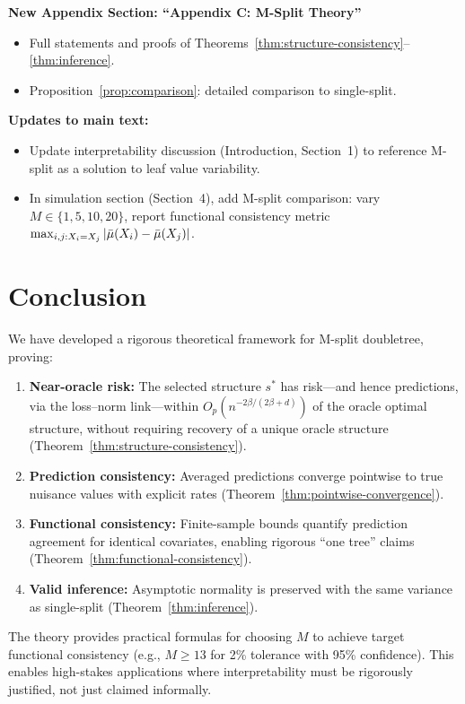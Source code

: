\documentclass[12pt]{article}
\begin{document}
\textbf{New Appendix Section: ``Appendix C: M-Split Theory''}
\begin{itemize}
\item Full statements and proofs of Theorems~\ref{thm:structure-consistency}--\ref{thm:inference}.
\item Proposition~\ref{prop:comparison}: detailed comparison to single-split.
\end{itemize}

\textbf{Updates to main text:}
\begin{itemize}
\item Update interpretability discussion (Introduction, Section~1) to reference M-split as a solution to leaf value variability.
\item In simulation section (Section~4), add M-split comparison: vary $M \in \{1, 5, 10, 20\}$, report functional consistency metric $\max_{i,j: X_i=X_j} |\bar{\mu}(X_i) - \bar{\mu}(X_j)|$.
\end{itemize}

\section{Conclusion}

We have developed a rigorous theoretical framework for M-split doubletree, proving:
\begin{enumerate}
\item \textbf{Near-oracle risk:} The selected structure $s^*$ has risk---and hence predictions, via the loss--norm link---within $O_p(n^{-2\beta/(2\beta+d)})$ of the oracle optimal structure, without requiring recovery of a unique oracle structure (Theorem~\ref{thm:structure-consistency}).
\item \textbf{Prediction consistency:} Averaged predictions converge pointwise to true nuisance values with explicit rates (Theorem~\ref{thm:pointwise-convergence}).
\item \textbf{Functional consistency:} Finite-sample bounds quantify prediction agreement for identical covariates, enabling rigorous ``one tree'' claims (Theorem~\ref{thm:functional-consistency}).
\item \textbf{Valid inference:} Asymptotic normality is preserved with the same variance as single-split (Theorem~\ref{thm:inference}).
\end{enumerate}

The theory provides practical formulas for choosing $M$ to achieve target functional consistency (e.g., $M \ge 13$ for 2\% tolerance with 95\% confidence). This enables high-stakes applications where interpretability must be rigorously justified, not just claimed informally.
\end{document}
